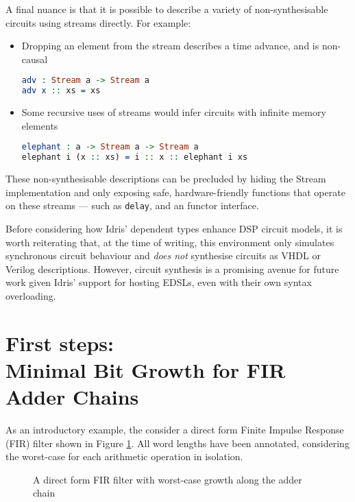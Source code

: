 \documentclass[conference]{IEEEtran}
\begin{document}
A final nuance is that it is possible to describe a variety of non-synthesisable
circuits using streams directly. For example:

\begin{itemize}
\item Dropping an element from the stream describes a time advance, and is
  non-causal
\begin{lstlisting}[language=idris]
adv : Stream a -> Stream a
adv x :: xs = xs
\end{lstlisting}
      
\item Some recursive uses of streams would infer circuits with infinite memory
  elements\cite{baaij_15}
\begin{lstlisting}[language=idris]
elephant : a -> Stream a -> Stream a
elephant i (x :: xs) = i :: x :: elephant i xs
\end{lstlisting}
\end{itemize}

These non-synthesisable descriptions can be precluded by hiding the Stream
implementation and only exposing safe, hardware-friendly functions that operate
on these streams --- such as \texttt{delay}, and an functor interface.

Before considering how Idris' dependent types enhance DSP circuit models, it is
worth reiterating that, at the time of writing, this environment only simulates
synchronous circuit behaviour and \emph{does not} synthesise circuits as VHDL or
Verilog descriptions. However, circuit synthesis is a promising avenue for
future work given Idris' support for hosting EDSLs, even with their own syntax
overloading\cite{brady_12}.


\section{First steps:\\Minimal Bit Growth for FIR Adder Chains}
\label{sec:fir}

As an introductory example, the consider a direct form Finite Impulse Response
(FIR) filter shown in Figure \ref{fig:fir_direct}. All word lengths have been
annotated, considering the worst-case for each arithmetic operation in
isolation. 

\begin{figure}[htb]
  \centering
  
  \caption{A direct form FIR filter with worst-case growth along the adder chain}
  \label{fig:fir_direct}
\end{figure}
\end{document}
